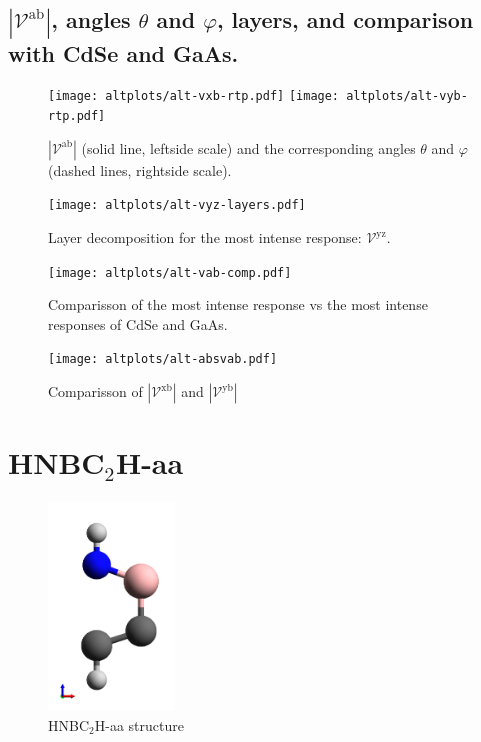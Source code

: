 \documentclass{article}
\let\Oldsection\section
\renewcommand{\section}{\FloatBarrier\Oldsection}
\let\Oldsubsection\subsection
\renewcommand{\subsection}{\FloatBarrier\Oldsubsection}
\begin{document}
\subsection{$|\mathcal{V}^{\mathrm{ab}}|$, angles
$\theta$ and $\varphi$, layers, and comparison with CdSe and GaAs.}
\begin{figure}[ht]
    \centering
    \texttt{[image: altplots/alt-vxb-rtp.pdf]}
    \texttt{[image: altplots/alt-vyb-rtp.pdf]}
    \caption{$|\mathcal{V}^{\mathrm{ab}}|$ (solid line, leftside scale) and the
    corresponding angles $\theta$ and $\varphi$ (dashed lines, rightside scale).}
    \label{fig:alt-rtp}
\end{figure}

\begin{figure}[ht]
    \centering
    \texttt{[image: altplots/alt-vyz-layers.pdf]}
    \caption{Layer decomposition for the most intense response:
    $\mathcal{V}^{\mathrm{yz}}$.}
    \label{fig:alt-lay}
\end{figure}

\begin{figure}[ht]
    \centering
    \texttt{[image: altplots/alt-vab-comp.pdf]}
    \caption{Comparisson of the most intense response vs the most intense
    responses of CdSe and GaAs.}
    \label{fig:alt-comp}
\end{figure}

\begin{figure}[h]
    \centering
    \texttt{[image: altplots/alt-absvab.pdf]}
    \caption{Comparisson of $|\mathcal{V}^{\mathrm{xb}}|$ and $|\mathcal{V}^{\mathrm{yb}}|$}    
    \label{fig:alt-xbybcomp}
\end{figure}




\section{HNBC$_{2}$H-aa} %

\begin{figure}[h]
    \centering
    \includegraphics[width=0.3\textwidth]{../hnbGh-aa/hnbGh-aa-figures/hnbGh-aa-2}
    \caption{HNBC$_{2}$H-aa structure}
    \label{fig:aastruc}
\end{figure}
\end{document}
